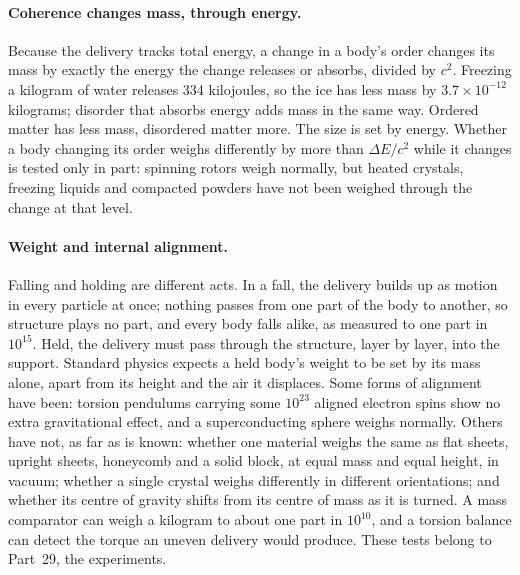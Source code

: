 \documentclass[11pt,a4paper]{article}
\begin{document}
\paragraph{Coherence changes mass, through energy.} Because the delivery tracks total energy, a change in a body's order changes its mass by exactly the energy the change releases or absorbs, divided by $c^2$. Freezing a kilogram of water releases 334 kilojoules, so the ice has less mass by $3.7\times10^{-12}$ kilograms; disorder that absorbs energy adds mass in the same way. Ordered matter has less mass, disordered matter more. The size is set by energy.  Whether a body changing its order weighs differently by more than $\Delta E/c^2$ while it changes is tested only in part: spinning rotors weigh normally, but heated crystals, freezing liquids and compacted powders have not been weighed through the change at that level. 

\paragraph{Weight and internal alignment.}  Falling and holding are different acts. In a fall, the delivery builds up as motion in every particle at once; nothing passes from one part of the body to another, so structure plays no part, and every body falls alike, as measured to one part in $10^{15}$. Held, the delivery must pass through the structure, layer by layer, into the support.  Standard physics expects a held body's weight to be set by its mass alone, apart from its height and the air it displaces.  Some forms of alignment have been: torsion pendulums carrying some $10^{23}$ aligned electron spins show no extra gravitational effect, and a superconducting sphere weighs normally. Others have not, as far as is known: whether one material weighs the same as flat sheets, upright sheets, honeycomb and a solid block, at equal mass and equal height, in vacuum; whether a single crystal weighs differently in different orientations; and whether its centre of gravity shifts from its centre of mass as it is turned. A mass comparator can weigh a kilogram to about one part in $10^{10}$, and a torsion balance can detect the torque an uneven delivery would produce. These tests belong to Part~29, the experiments.
\end{document}
